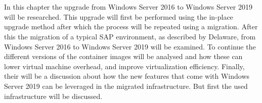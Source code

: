 
\chapter{}
\label{ch:methodologie}



In this chapter the upgrade from Windows Server 2016 to Windows Server 2019 will be researched. This upgrade will first be performed using the in-place upgrade method after which the process will be repeated using a migration. After this the migration of a typical SAP environment, as described by Delaware, from Windows Server 2016 to Windows Server 2019 will be examined. To continue the different versions of the container images will be analysed and how these can lower virtual machine overhead, and improve virtualization efficiency. Finally, their will be a discussion about how the new features that come with Windows Server 2019 can be leveraged in the migrated infrastructure. But first the used infrastructure will be discussed.

